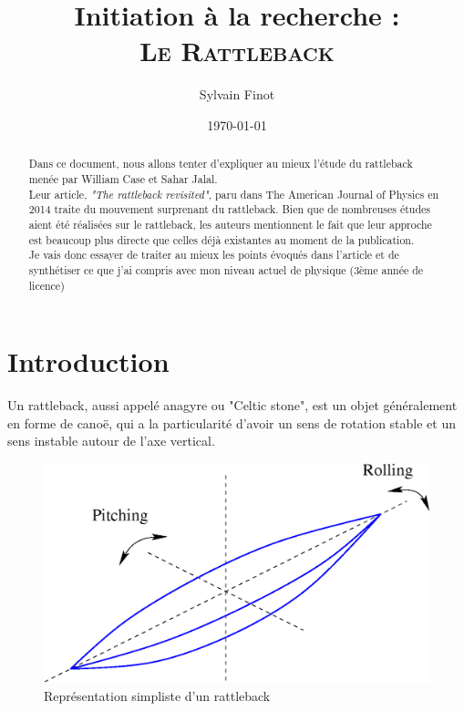\documentclass[12pt,a4paper]{article}
\author{Sylvain Finot}
\title{Initiation à la recherche :\\[1ex] \scshape Le Rattleback}
\date{\today}
\begin{document}
	\maketitle
	\thispagestyle{firststyle}
	\begin{abstract}
		Dans ce document, nous allons tenter d'expliquer au mieux l'étude du rattleback menée par William Case et Sahar Jalal.\\
		Leur article, \textit{"The rattleback revisited"}, paru dans The American Journal of Physics en 2014 traite du mouvement surprenant du rattleback. Bien que de nombreuses études aient été réalisées sur le rattleback, les auteurs mentionnent le fait que leur approche est beaucoup plus directe que celles déjà existantes au moment de la publication.\\
		
		Je vais donc essayer de traiter au mieux les points évoqués dans l'article et de synthétiser ce que j'ai compris avec mon niveau actuel de physique (3ème année de licence)
	\end{abstract}
	\section{Introduction}
	Un rattleback, aussi appelé anagyre ou "Celtic stone", est un objet généralement en forme de canoë, qui a la particularité d'avoir un sens de rotation stable et un sens instable autour de l'axe vertical.
	\begin{figure}[h]
		\centering
		\includegraphics[scale=0.2]{Rolling-pitching}
		\caption[]{Représentation simpliste d'un rattleback}
		\label{fig:rolling-pitching}
	\end{figure}
	
\end{document}
